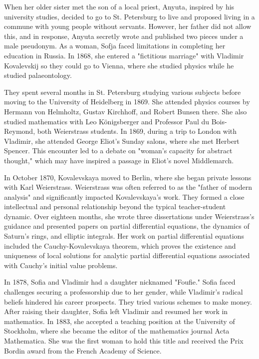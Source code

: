 \documentclass[12pt,a4paper]{article}
\begin{document}
When her older sister met the son of a local priest, Anyuta, inspired by his university studies, decided to go to St. Petersburg to live and proposed living in a commune with young people without servants. However, her father did not allow this, and in response, Anyuta secretly wrote and published two pieces under a male pseudonym. As a woman, Sofja faced limitations in completing her education in Russia. In 1868, she entered a "fictitious marriage" with Vladimir Kovalevskij so they could go to Vienna, where she studied physics while he studied palaeontology.


They spent several months in St. Petersburg studying various subjects before moving to the University of Heidelberg in 1869. She attended physics courses by Hermann von Helmholtz, Gustav Kirchhoff, and Robert Bunsen there. She also studied mathematics with Leo Königsberger and Professor Paul du Bois-Reymond, both Weierstrass students. In 1869, during a trip to London with Vladimir, she attended George Eliot's Sunday salons, where she met Herbert Spencer. This encounter led to a debate on "woman's capacity for abstract thought," which may have inspired a passage in Eliot's novel Middlemarch.


In October 1870, Kovalevskaya moved to Berlin, where she began private lessons with Karl Weierstrass. Weierstrass was often referred to as the "father of modern analysis" and significantly impacted Kovalevskaya's work. They formed a close intellectual and personal relationship beyond the typical teacher-student dynamic. Over eighteen months, she wrote three dissertations under Weierstrass's guidance and presented papers on partial differential equations, the dynamics of Saturn's rings, and elliptic integrals. Her work on partial differential equations included the Cauchy-Kovalevskaya theorem, which proves the existence and uniqueness of local solutions for analytic partial differential equations associated with Cauchy's initial value problems.


In 1878, Sofia and Vladimir had a daughter nicknamed "Foufie." Sofia faced challenges securing a professorship due to her gender, while Vladimir's radical beliefs hindered his career prospects. They tried various schemes to make money. After raising their daughter, Sofia left Vladimir and resumed her work in mathematics. In 1883, she accepted a teaching position at the University of Stockholm, where she became the editor of the mathematics journal Acta Mathematica. She was the first woman to hold this title and received the Prix Bordin award from the French Academy of Science.
\end{document}
